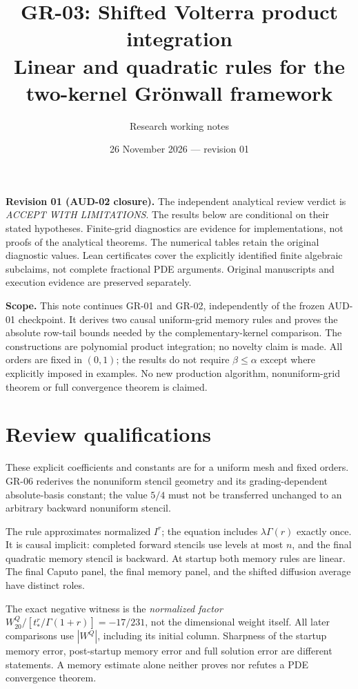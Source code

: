 \documentclass[11pt,a4paper]{article}
\title{GR-03: Shifted Volterra product integration\\\large Linear and quadratic rules for the two-kernel Gr\"onwall framework}
\author{Research working notes}
\date{26 November 2026 --- revision 01}
\begin{document}
\maketitle
\noindent\textbf{Revision 01 (AUD-02 closure).}
The independent analytical review verdict is \emph{ACCEPT WITH LIMITATIONS}.
The results below are conditional on their stated hypotheses. Finite-grid
diagnostics are evidence for implementations, not proofs of the analytical
theorems. The numerical tables retain the original diagnostic values.
Lean certificates cover the explicitly identified finite algebraic subclaims,
not complete fractional PDE arguments. Original manuscripts and execution
evidence are preserved separately.

\noindent\textbf{Scope.} This note continues GR-01 and GR-02, independently of the frozen AUD-01 checkpoint. It derives two causal uniform-grid memory rules and proves the absolute row-tail bounds needed by the complementary-kernel comparison. The constructions are polynomial product integration; no novelty claim is made. All orders are fixed in $(0,1)$; the results do not require $\beta\le\alpha$ except where explicitly imposed in examples. No new production algorithm, nonuniform-grid theorem or full convergence theorem is claimed.

\section*{Review qualifications}
These explicit coefficients and constants are for a uniform mesh and fixed
orders. GR-06 rederives the nonuniform stencil geometry and its
grading-dependent absolute-basis constant; the value $5/4$ must not be
transferred unchanged to an arbitrary backward nonuniform stencil.

The rule approximates normalized $I^r$; the equation includes
$\lambda\Gamma(r)$ exactly once. It is causal implicit: completed forward
stencils use levels at most $n$, and the final quadratic memory stencil is
backward. At startup both memory rules are linear. The final Caputo panel,
the final memory panel, and the shifted diffusion average have distinct roles.

The exact negative witness is the \emph{normalized factor}
$W^Q_{20}/[t_*^r/\Gamma(1+r)]=-17/231$, not the dimensional weight itself.
All later comparisons use $|W^Q|$, including its initial column.
Sharpness of the startup memory error, post-startup memory error and full
solution error are different statements. A memory estimate alone neither
proves nor refutes a PDE convergence theorem.
\end{document}
